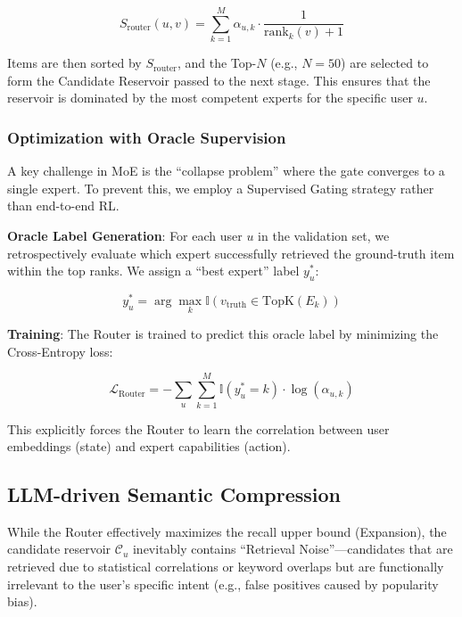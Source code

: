 \begin{equation}
S_{\mathrm{router}}\left( u,v \right) = \sum_{k = 1}^{M}\alpha_{u,k} \cdot \frac{1}{\mathrm{rank}_{k}\left( v \right) + 1}
\end{equation}

Items are then sorted by $S_{\mathrm{router}}$, and the Top-$N$ (e.g., $N=50$) are selected to form the Candidate Reservoir passed to the next stage. This ensures that the reservoir is dominated by the most competent experts for the specific user $u$.

\subsubsection{Optimization with Oracle Supervision}

A key challenge in MoE is the ``collapse problem'' where the gate converges to a single expert. To prevent this, we employ a Supervised Gating strategy rather than end-to-end RL.

\textbf{Oracle Label Generation}: For each user $u$ in the validation set, we retrospectively evaluate which expert successfully retrieved the ground-truth item within the top ranks. We assign a ``best expert'' label $y_{u}^{\ast}$:

\begin{equation}
y_{u}^{\ast} = \arg\max_{k}\mathbb{I}\left( v_{\mathrm{truth}} \in \mathrm{TopK}\left( E_{k} \right) \right)
\end{equation}

\textbf{Training}: The Router is trained to predict this oracle label by minimizing the Cross-Entropy loss:

\begin{equation}
\mathcal{L}_{\mathrm{Router}} = - \sum_{u}^{}{\sum_{k = 1}^{M}\mathbb{I}}\left( y_{u}^{\ast} = k \right) \cdot \log\left( \alpha_{u,k} \right)
\end{equation}

This explicitly forces the Router to learn the correlation between user embeddings (state) and expert capabilities (action).

\subsection{LLM-driven Semantic Compression}

While the Router effectively maximizes the recall upper bound (Expansion), the candidate reservoir $\mathcal{C}_{u}$ inevitably contains ``Retrieval Noise''---candidates that are retrieved due to statistical correlations or keyword overlaps but are functionally irrelevant to the user's specific intent (e.g., false positives caused by popularity bias).

